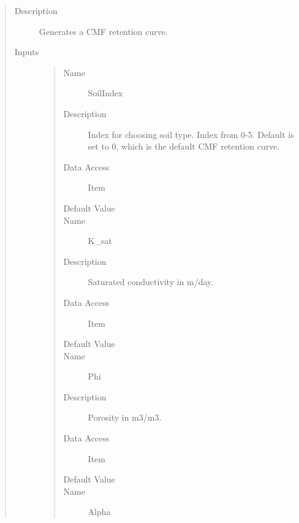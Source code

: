 \documentclass[letterpaper,10pt,english]{sphinxmanual}
\begin{document}
\begin{quote}\begin{description}
\item[{Description}] \leavevmode
Generates a CMF retention curve.

\item[{Inputs}] \leavevmode\begin{quote}\begin{description}
\item[{Name}] \leavevmode
SoilIndex

\item[{Description}] \leavevmode
Index for choosing soil type. Index from 0-5. Default is set to 0, which is the default CMF
retention curve.

\item[{Data Access}] \leavevmode
Item

\item[{Default Value}] \leavevmode
{}

\item[{Name}] \leavevmode
K\_sat

\item[{Description}] \leavevmode
Saturated conductivity in m/day.

\item[{Data Access}] \leavevmode
Item

\item[{Default Value}] \leavevmode
{}

\item[{Name}] \leavevmode
Phi

\item[{Description}] \leavevmode
Porosity in m3/m3.

\item[{Data Access}] \leavevmode
Item

\item[{Default Value}] \leavevmode
{}

\item[{Name}] \leavevmode
Alpha


\end{description}
\end{quote}
\end{description}
\end{quote}
\end{document}
